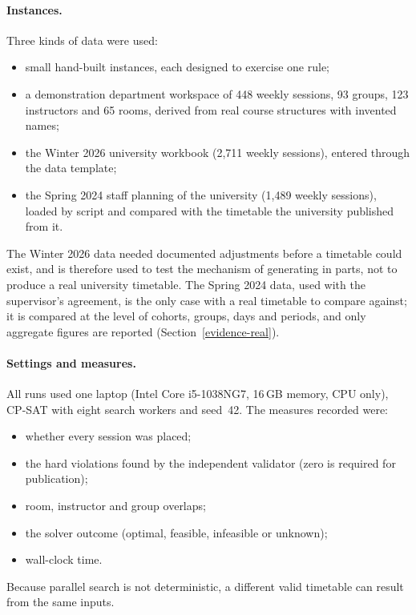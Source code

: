 \paragraph{Instances.} Three kinds of data were used:
\begin{itemize}
\item small hand-built instances, each designed to exercise one rule;
\item a demonstration department workspace of 448 weekly sessions, 93 groups, 123 instructors and 65 rooms, derived from real course structures with invented names;
\item the Winter 2026 university workbook (2{,}711 weekly sessions), entered through the data template;
\item the Spring 2024 staff planning of the university (1{,}489 weekly sessions), loaded by script and compared with the timetable the university published from it.
\end{itemize}
The Winter 2026 data needed documented adjustments before a timetable could exist, and is therefore used to test the mechanism of generating in parts, not to produce a real university timetable. The Spring 2024 data, used with the supervisor's agreement, is the only case with a real timetable to compare against; it is compared at the level of cohorts, groups, days and periods, and only aggregate figures are reported (Section~\ref{evidence-real}).

\paragraph{Settings and measures.} All runs used one laptop (Intel Core i5-1038NG7, 16\,GB memory, CPU only), CP-SAT with eight search workers and seed~42. The measures recorded were:
\begin{itemize}
\item whether every session was placed;
\item the hard violations found by the independent validator (zero is required for publication);
\item room, instructor and group overlaps;
\item the solver outcome (optimal, feasible, infeasible or unknown);
\item wall-clock time.
\end{itemize}
Because parallel search is not deterministic, a different valid timetable can result from the same inputs.

